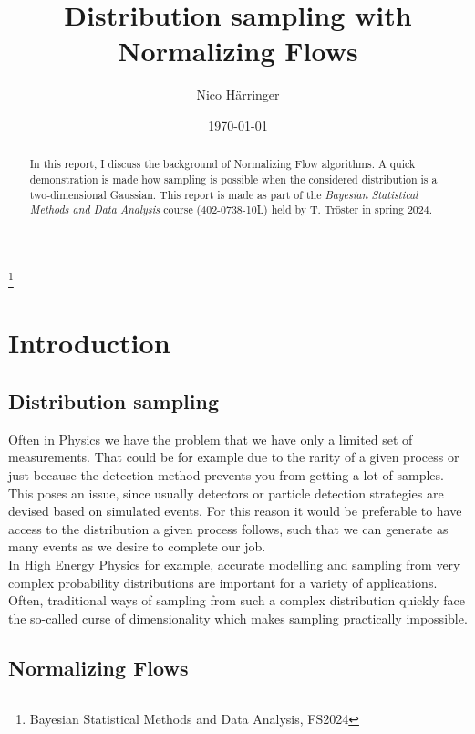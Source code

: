 \documentclass[
nofootinbib,
 amsmath,amssymb,
 aps,
]{revtex4-2}
\begin{document}
\title{Distribution sampling with Normalizing Flows}
\thanks{Bayesian Statistical Methods and Data Analysis, FS2024}

\author{Nico H\"arringer}


\date{\today}

\begin{abstract}
In this report, I discuss the background of Normalizing Flow algorithms. A quick demonstration is made how sampling is possible when the considered distribution is a two-dimensional Gaussian. This report is made as part of the \textit{Bayesian Statistical Methods and Data Analysis} course (402-0738-10L) held by T. Tr\"oster in spring 2024.
\end{abstract}


\maketitle

\section{Introduction}
\subsection{Distribution sampling}

Often in Physics we have the problem that we have only a limited set of measurements. That could be for example due to the rarity of a given process or just because the detection method prevents you from getting a lot of samples. This poses an issue, since usually detectors or particle detection strategies are devised based on simulated events. For this reason it would be preferable to have access to the distribution a given process follows, such that we can generate as many events as we desire to complete our job. \\

In High Energy Physics for example, accurate modelling and sampling from very complex probability distributions are important for a variety of applications. Often, traditional ways of sampling from such a complex distribution quickly face the so-called curse of dimensionality which makes sampling practically impossible. \\

\subsection{Normalizing Flows}
\end{document}
